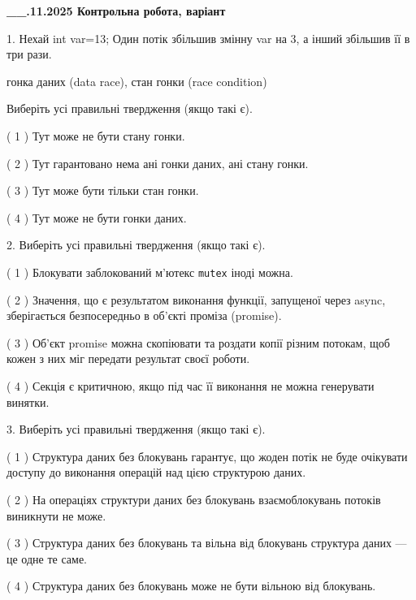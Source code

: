 \documentclass[12pt, ukrainian]{article}
\def\code#1{\Verb!#1!}
\begin{document}
\newpage
\begin {large}

\textbf{\_\_.11.2025 Контрольна робота, варіант  }\par


{
1. Нехай int var=13; Один потік збільшив змінну var на 3, а інший збільшив її в три рази.

гонка даних (data race), стан гонки (race condition)

Виберіть усі правильні твердження (якщо такі є).\par
\vspace{2mm}
( 1 ) Тут може не бути стану гонки.%

( 2 ) Тут гарантовано нема ані гонки даних, ані стану гонки.%

( 3 ) Тут може бути тільки стан гонки.%

( 4 ) Тут може не бути гонки даних.%


2. Виберіть усі правильні твердження (якщо такі є).\par
\vspace{2mm}

( 1 ) Блокувати заблокований м’ютекс  \code{mutex} іноді можна.%

( 2 ) Значення, що є результатом виконання функції, запущеної через async, зберігається безпосередньо в об’єкті проміза (promise).%

( 3 ) Об’єкт promise можна скопіювати та роздати копії різним потокам, щоб кожен з них міг передати результат своєї роботи.%

( 4 ) Секція є критичною, якщо під час її виконання не можна генерувати винятки.%


3. Виберіть усі правильні твердження (якщо такі є).\par
\vspace{2mm}

( 1 ) Структура даних без блокувань гарантує, що жоден потік не буде очікувати доступу до виконання операцій над цією структурою даних.%

( 2 ) На операціях структури даних без блокувань взаємоблокувань потоків виникнути не може.%

( 3 ) Структура даних без блокувань та вільна від блокувань структура даних --- це одне те саме.%

( 4 ) Структура даних без блокувань може не бути вільною від блокувань.%


}
\end{large}
\end{document}
